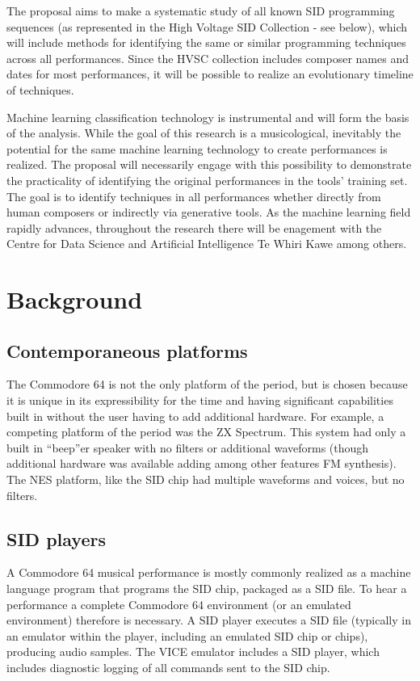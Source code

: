 \documentclass[10pt]{article}
\begin{document}
\begin{multicols*}{2}
  The proposal aims to make a systematic study of all known SID
  programming sequences (as represented in the High Voltage SID
  Collection - see below), which will include methods for identifying
  the same or similar programming techniques across all
  performances. Since the HVSC collection includes composer names and dates
  for most performances, it will be possible to realize an
  evolutionary timeline of techniques.

  Machine learning classification technology is instrumental and will
  form the basis of the analysis. While the goal of this research is a
  musicological, inevitably the potential for the same machine
  learning technology to create performances is realized. The proposal
  will necessarily engage with this possibility to demonstrate the
  practicality of identifying the original performances in the tools'
  training set. The goal is to identify techniques in all performances
  whether directly from human composers or indirectly via generative
  tools.  As the machine learning field rapidly advances, throughout
  the research there will be enagement with the Centre for Data
  Science and Artificial Intelligence Te Whiri Kawe among others.

  \section{Background}

  \subsection{Contemporaneous platforms}
  The Commodore 64 is not the only platform of the period, but is
  chosen because it is unique in its expressibility for the time and
  having significant capabilities built in without the user having to
  add additional hardware. For example, a competing platform of the
  period was the ZX Spectrum. This system had only a built in
  ``beep''er speaker with no filters or additional waveforms (though
  additional hardware was available adding among other features
  FM synthesis). The NES platform, like the SID chip had multiple
  waveforms and voices, but no filters.

  \subsection{SID players}
  A Commodore 64 musical performance is mostly commonly realized as a
  machine language program that programs the SID chip, packaged as a
  SID file. To hear a performance a complete Commodore 64 environment
  (or an emulated environment) therefore is necessary. A SID player
  executes a SID file (typically in an emulator within the player,
  including an emulated SID chip or chips), producing audio samples.
  The VICE emulator includes a SID player, which includes diagnostic
  logging of all commands sent to the SID chip.


\end{multicols*}
\end{document}
